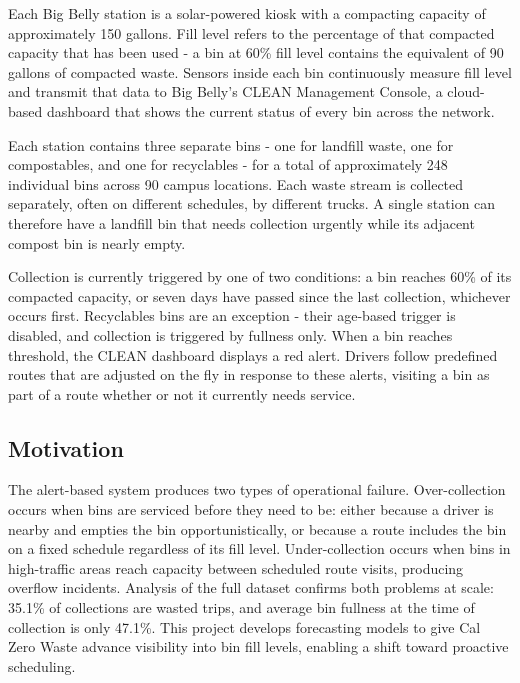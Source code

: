 \documentclass[11pt]{article}
\begin{document}
Each Big Belly station is a solar-powered kiosk with a compacting capacity of approximately
150 gallons. Fill level refers to the percentage of that compacted capacity that has been
used - a bin at 60\% fill level contains the equivalent of 90 gallons of compacted waste.
Sensors inside each bin continuously measure fill level and transmit that data to Big
Belly's CLEAN Management Console, a cloud-based dashboard that shows the current status of
every bin across the network.

Each station contains three separate bins - one for landfill waste, one for compostables,
and one for recyclables - for a total of approximately 248 individual bins across 90 campus
locations. Each waste stream is collected separately, often on different schedules, by
different trucks. A single station can therefore have a landfill bin that needs collection
urgently while its adjacent compost bin is nearly empty.

Collection is currently triggered by one of two conditions: a bin reaches 60\% of its
compacted capacity, or seven days have passed since the last collection, whichever occurs
first. Recyclables bins are an exception - their age-based trigger is disabled, and
collection is triggered by fullness only. When a bin reaches threshold, the CLEAN dashboard
displays a red alert. Drivers follow predefined routes that are adjusted on the fly in
response to these alerts, visiting a bin as part of a route whether or not it currently
needs service.

\subsection{Motivation}

The alert-based system produces two types of operational failure. Over-collection occurs
when bins are serviced before they need to be: either because a driver is nearby and
empties the bin opportunistically, or because a route includes the bin on a fixed schedule
regardless of its fill level. Under-collection occurs when bins in high-traffic areas reach
capacity between scheduled route visits, producing overflow incidents. Analysis of the full
dataset confirms both problems at scale: 35.1\% of collections are wasted trips, and
average bin fullness at the time of collection is only 47.1\%. This project develops
forecasting models to give Cal Zero Waste advance visibility into bin fill levels, enabling
a shift toward proactive scheduling.

\newpage
\end{document}
